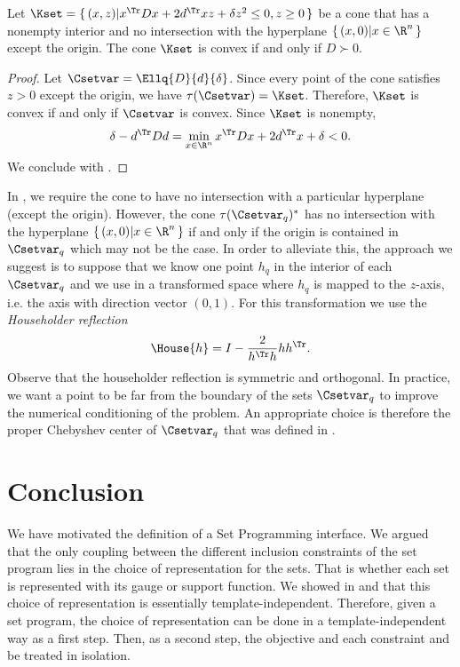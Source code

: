 \documentclass[11pt,twoside,a4paper,openright]{uclouvain-thesis}
\begin{document}
\begin{mycoro}
  \label{coro:convexcone}
  Let $\Kset = \{\, (x, z) | x^\Tr D x + 2d^\Tr xz + \delta z^2 \leq 0, z \geq 0 \,\}$ be a cone that has a nonempty interior
  and no intersection
  with the hyperplane $\{\, (x, 0) | x \in \R^n \,\}$ except the origin.
  The cone $\Kset$ is convex if and only if $D \succ 0$.
  \begin{proof}
    Let $\Csetvar = \Ellq{D}{d}{\delta}$.
    Since every point of the cone satisfies $z > 0$ except the origin, we have $\tau(\Csetvar) = \Kset$.
    Therefore, $\Kset$ is convex if and only if $\Csetvar$ is convex.
    Since $\Kset$ is nonempty,
    \[ \delta - d^\Tr D d = \min_{x \in \R^n} x^\Tr D x + 2d^\Tr x + \delta < 0. \]
    We conclude with .
  \end{proof}
\end{mycoro}


In , we require the cone to have no intersection with a particular hyperplane (except the origin).
However, the cone $\tau(\Csetvar_q)^*$ has no intersection with the hyperplane $\{\, (x, 0) | x \in \R^n \,\}$ if and only if the origin is contained in $\Csetvar_q$ which may not be the case.
In order to alleviate this, the approach we suggest is to suppose that we know one point $h_q$ in the interior of
each $\Csetvar_q$ and we use  in a transformed space where $h_q$ is mapped to the $z$-axis, i.e. the axis with direction vector $(0, 1)$.
For this transformation we use the \emph{Householder reflection} \cite[Section~5.1.2]{golub2012matrix}
\[ \House{h} = I - \frac{2}{h^\Tr h} hh^\Tr. \]
Observe that the householder reflection is symmetric and orthogonal.
In practice, we want a point to be far from the boundary of the sets $\Csetvar_q$
to improve the numerical conditioning of the problem.
An appropriate choice is therefore the proper Chebyshev center of $\Csetvar_q$
that was defined in .


\section{Conclusion}

We have motivated the definition of a Set Programming interface.
We argued that the only coupling between the different inclusion constraints
of the set program lies in the choice of representation for the sets.
That is whether each set is represented with its gauge or support function.
We showed in  and  that this choice of representation
is essentially template-independent.
Therefore, given a set program, the choice of representation can be done in a template-independent way as a first step.
Then, as a second step, the objective and each constraint and be treated in isolation.
\end{document}
